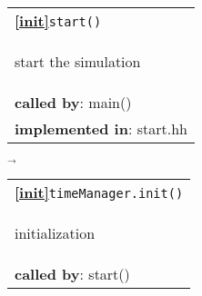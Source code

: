 \begin{landscape}
{%
  \begin{tabular}{|l|} \hline
    \textbf{\textcircled{\ref{init}}}\verb+start()+ \\
    \begin{scriptsize}start the simulation\end{scriptsize}\\
    \textbf{called by}: main() \\
    \textbf{implemented in}: start.hh \\
    \hline
  \end{tabular}
    $\overrightarrow{}$
  \begin{tabular}{|l|} \hline
    \textbf{\textcircled{\ref{init}}}\verb+timeManager.init()+ \\
    \begin{scriptsize}initialization\end{scriptsize}\\
    \textbf{called by}: start() \\

\end{tabular}}
\end{landscape}

